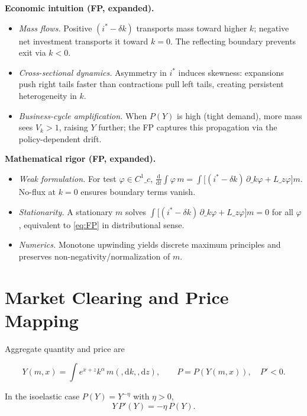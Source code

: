 ﻿\documentclass[11pt,letterpaper,oneside]{article}
\numberwithin{equation}{section}
\newcommand{\1}{\mathbf{1}}
\newcommand{\diff}{,\mathrm{d}}
\newcommand{\Lz}{L\_z}
\begin{document}
\begin{tcolorbox}[didacticstyle]
\textbf{Economic intuition (FP, expanded).}
\begin{itemize}[leftmargin=1.15em,itemsep=0.25em]
  \item \emph{Mass flows.} Positive $(i^*-\delta k)$ transports mass toward higher $k$; negative net investment transports it toward $k=0$. The reflecting boundary prevents exit via $k<0$.
  \item \emph{Cross-sectional dynamics.} Asymmetry in $i^*$ induces skewness: expansions push right tails faster than contractions pull left tails, creating persistent heterogeneity in $k$.
  \item \emph{Business-cycle amplification.} When $P(Y)$ is high (tight demand), more mass sees $V_k>1$, raising $Y$ further; the FP captures this propagation via the policy-dependent drift.
\end{itemize}
\end{tcolorbox}

\begin{tcolorbox}[mathstyle]
\textbf{Mathematical rigor (FP, expanded).}
\begin{itemize}[leftmargin=1.15em,itemsep=0.25em]
  \item \emph{Weak formulation.} For test $\varphi\in C^1\_c$, $\frac{\mathrm d}{\mathrm dt}\int \varphi\,m=\int \big[(i^*-\delta k)\,\partial\_k\varphi + \Lz\varphi\big] m$. No-flux at $k=0$ ensures boundary terms vanish.
  \item \emph{Stationarity.} A stationary $m$ solves $\int \big[(i^*-\delta k)\,\partial\_k\varphi + \Lz\varphi\big] m=0$ for all $\varphi$, equivalent to \eqref{eq:FP} in distributional sense.
  \item \emph{Numerics.} Monotone upwinding yields discrete maximum principles and preserves non-negativity/normalization of $m$.
\end{itemize}
\end{tcolorbox}

\section{Market Clearing and Price Mapping}
Aggregate quantity and price are

$$
Y(m,x)=\int e^{x+z}k^\alpha\,m(\diff k,\diff z),\qquad P=P(Y(m,x)),\quad P'<0.
$$

In the isoelastic case $P(Y)=Y^{-\eta}$ with $\eta>0$,
\begin{equation}\label{eq:isoelastic}
Y\,P'(Y) = -\eta\, P(Y).
\end{equation}
\end{document}
